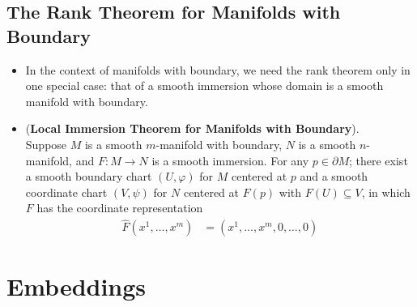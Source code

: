 \documentclass[11pt]{article}
\begin{document}
\subsection{The Rank Theorem for Manifolds with Boundary}
\begin{itemize}
\item \begin{remark}
In the context of manifolds with boundary, we need the rank theorem only in one special case: that of a smooth immersion whose domain is a smooth manifold with
boundary. 
\end{remark}

\item \begin{theorem} (\textbf{Local Immersion Theorem for Manifolds with Boundary}). \citep{lee2003introduction} \\
Suppose $M$ is a smooth $m$-manifold with boundary, $N$ is a smooth $n$-manifold, and $F: M \rightarrow N$ is a smooth immersion. For any $p \in \partial M$; there exist a smooth boundary chart $(U,\varphi)$ for $M$ centered at $p$ and a smooth coordinate chart $(V, \psi)$ for $N$ centered at $F(p)$ with $F(U) \subseteq V$, in which $F$ has the coordinate representation
\begin{align}
\widehat{F}(x^1,\ldots, x^m) &=  (x^1,\ldots, x^m, 0,\ldots, 0) \label{eqn: local_immersion}
\end{align}
\end{theorem}
\end{itemize}

\section{Embeddings}
\end{document}
